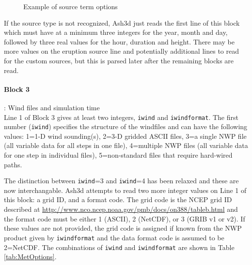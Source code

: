 \begin{figure}[htbp]
\parbox{15cm}{\caption{\label{FigSourceOptions}
Example of source term options}}
\end{figure}
If the source type is not recognized, Ash3d just reads the first line of this
block which must have at a minimum three integers for the year, month and day,
followed by three real values for the hour, duration and height.  There may
be more values on the eruption source line and potentially additional lines to
read for the custom sources, but this is parsed later after the remaining blocks
are read.

\paragraph{Block 3}: Wind files and simulation time\\
Line 1 of Block 3 gives at least two integers, \texttt{iwind} and \texttt{iwindformat}.
The first number (\texttt{iwind}) specifies the structure of the windfiles and can
have the following values:
1=1-D wind sounding(s),
2=3-D gridded ASCII files,
3=a single NWP file (all variable data for all steps in one file),
4=multiple NWP files (all variable data for one step in individual files),
5=non-standard files that require hard-wired paths.

The distinction between \texttt{iwind}=3 and \texttt{iwind}=4 has been
relaxed and these are now interchangable.
Ash3d attempts to read two more integer values on Line 1
of this block: a grid ID, and a format code. The grid code is the NCEP grid
ID described at \url{http://www.nco.ncep.noaa.gov/pmb/docs/on388/tableb.html}
and the format code must be either 1 (ASCII), 2 (NetCDF), or 3 (GRIB v1 or v2).
If these values are not provided, the grid code is assigned if known from the
NWP product given by \texttt{iwindformat} and the data format code is assumed to
be 2=NetCDF. The combinations of \texttt{iwind} and \texttt{iwindformat} are shown in
Table \ref{tab:MetOptions}.

